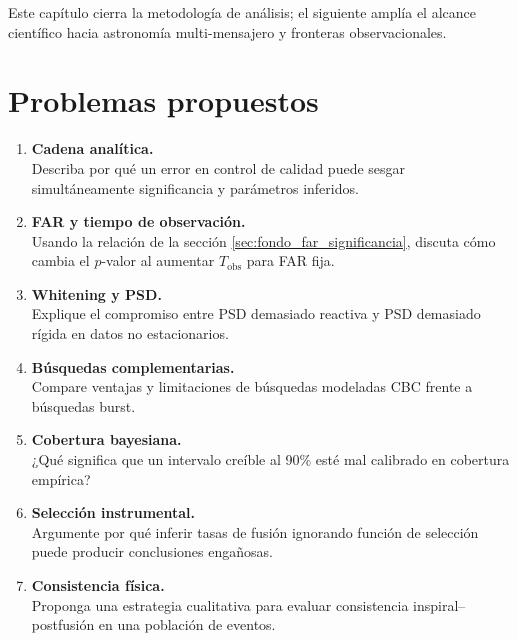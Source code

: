 Este capítulo cierra la metodología de análisis; el siguiente amplía el alcance científico hacia astronomía multi-mensajero y fronteras observacionales.

\section*{Problemas propuestos}

\begin{enumerate}[leftmargin=2.2em, label=\textbf{P\arabic*.}]

\item \textbf{Cadena analítica.} \\
Describa por qué un error en control de calidad puede sesgar simultáneamente significancia y parámetros inferidos.

\item \textbf{FAR y tiempo de observación.} \\
Usando la relación de la sección \ref{sec:fondo_far_significancia}, discuta cómo cambia el $p$-valor al aumentar $T_{\mathrm{obs}}$ para FAR fija.

\item \textbf{Whitening y PSD.} \\
Explique el compromiso entre PSD demasiado reactiva y PSD demasiado rígida en datos no estacionarios.

\item \textbf{Búsquedas complementarias.} \\
Compare ventajas y limitaciones de búsquedas modeladas CBC frente a búsquedas burst.

\item \textbf{Cobertura bayesiana.} \\
¿Qué significa que un intervalo creíble al 90\% esté mal calibrado en cobertura empírica?

\item \textbf{Selección instrumental.} \\
Argumente por qué inferir tasas de fusión ignorando función de selección puede producir conclusiones engañosas.

\item \textbf{Consistencia física.} \\
Proponga una estrategia cualitativa para evaluar consistencia inspiral--postfusión en una población de eventos.

\end{enumerate}
